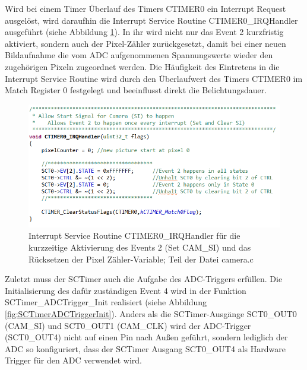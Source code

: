 
Wird bei einem Timer Überlauf des Timers CTIMER0 ein Interrupt Request ausgelöst, wird daraufhin die Interrupt Service Routine \glqq{}CTIMER0\_IRQHandler\grqq{} ausgeführt (siehe Abbildung \ref{fig:CTIMER0IRQHandler}). In ihr wird nicht nur das Event 2 kurzfristig aktiviert, sondern auch der Pixel-Zähler zurückgesetzt, damit bei einer neuen Bildaufnahme die vom ADC aufgenommenen Spannungswerte wieder den zugehörigen Pixeln zugeordnet werden. Die Häufigkeit des Eintretens in die Interrupt Service Routine wird durch den Überlaufwert des Timers CTIMER0 im Match Register 0 festgelegt und beeinflusst direkt die Belichtungsdauer.\vspace{11pt}


\begin{figure}[H] %
\includegraphics[width=.95\textwidth]{sec7/images/code/CTIMER0IRQHandler} 
\centering
\captionsetup{width=.95\textwidth}
\caption[Interrupt Service Routine \glqq{}CTIMER0\_IRQHandler\grqq{} aus der Datei \glqq{}camera.c\grqq{}]{Interrupt Service Routine \glqq{}CTIMER0\_IRQHandler\grqq{} für die kurzzeitige Aktivierung des Events 2 (Set CAM\_SI) und das Rücksetzen der Pixel Zähler-Variable; Teil der Datei \glqq{}camera.c\grqq{}}\centering
\label{fig:CTIMER0IRQHandler}
\end{figure}


Zuletzt muss der SCTimer auch die Aufgabe des ADC-Triggers erfüllen. Die Initialisierung des dafür zuständigen Event 4 wird in der Funktion \glqq{}SCTimer\_ADCTrigger\_Init\grqq{} realisiert (siehe Abbildung \ref{fig:SCTimerADCTriggerInit}). Anders als die SCTimer-Ausgänge SCT0\_OUT0 (CAM\_SI) und SCT0\_OUT1 (CAM\_CLK) wird der ADC-Trigger (SCT0\_OUT4) nicht auf einen Pin nach Außen geführt, sondern lediglich der ADC so konfiguriert, dass der SCTimer Ausgang SCT0\_OUT4 als Hardware Trigger für den ADC verwendet wird.

